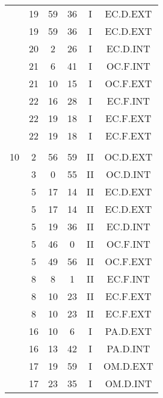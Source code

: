\documentclass[12pt, a4paper]{article}
\begin{document}
\begin{multicols}{3}
{\begin{tabular}{c c c c c c}
	 	 	 	 & 19 & 59 & 36 & I & EC.D.EXT\\%
	 	 	 	 & 19 & 59 & 36 & I & EC.D.EXT\\%
	 	 	 	 & 20 & 2 & 26 & I & EC.D.INT\\%
	 	 	 	 & 21 & 6 & 41 & I & OC.F.INT\\%
	 	 	 	 & 21 & 10 & 15 & I & OC.F.EXT\\%
	 	 	 	 & 22 & 16 & 28 & I & EC.F.INT\\%
	 	 	 	 & 22 & 19 & 18 & I & EC.F.EXT\\%
	 	 	 	 & 22 & 19 & 18 & I & EC.F.EXT\\%
	 	 	 	 & & & & & \\%
	 	 	 	10 & 2 & 56 & 59 & II & OC.D.EXT\\%
	 	 	 	 & 3 & 0 & 55 & II & OC.D.INT\\%
	 	 	 	 & 5 & 17 & 14 & II & EC.D.EXT\\%
	 	 	 	 & 5 & 17 & 14 & II & EC.D.EXT\\%
	 	 	 	 & 5 & 19 & 36 & II & EC.D.INT\\%
	 	 	 	 & 5 & 46 & 0 & II & OC.F.INT\\%
	 	 	 	 & 5 & 49 & 56 & II & OC.F.EXT\\%
	 	 	 	 & 8 & 8 & 1 & II & EC.F.INT\\%
	 	 	 	 & 8 & 10 & 23 & II & EC.F.EXT\\%
	 	 	 	 & 8 & 10 & 23 & II & EC.F.EXT\\%
	 	 	 	 & 16 & 10 & 6 & I & PA.D.EXT\\%
	 	 	 	 & 16 & 13 & 42 & I & PA.D.INT\\%
	 	 	 	 & 17 & 19 & 59 & I & OM.D.EXT\\%
	 	 	 	 & 17 & 23 & 35 & I & OM.D.INT\\%

\end{tabular}}
\end{multicols}
\end{document}
